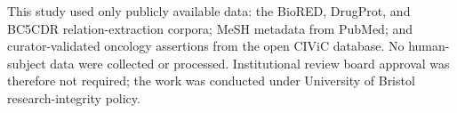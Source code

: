 This study used only publicly available data: the BioRED, DrugProt,
and BC5CDR relation-extraction corpora; MeSH metadata from PubMed;
and curator-validated oncology assertions from the open CIViC
database. No human-subject data were collected or processed.
Institutional review board approval was therefore not required; the
work was conducted under University of Bristol research-integrity
policy.